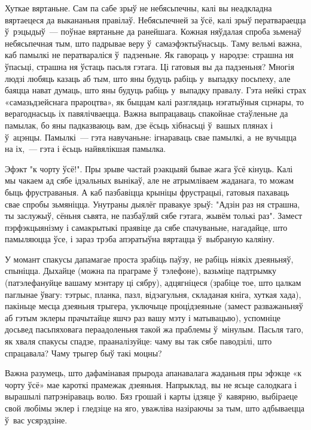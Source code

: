 Хуткае вяртаньне. Сам па сабе зрыў не небясьпечны, калі вы неадкладна вяртаецеся да выкананьня правілаў. Небясьпечней за ўсё, калі зрыў ператвараецца ў~рэцыдыў~--- поўнае вяртаньне да ранейшага. Кожная няўдалая спроба зьменаў небясьпечная тым, што падрывае веру ў~самаэфэктыўнасьць. Таму вельмі важна, каб памылкі не ператвараліся ў~падзеньне. Як гавораць у~народзе: страшна ня ўпасьці, страшна ня ўстаць пасьля гэтага. Ці гатовыя вы да падзеньня? Многія людзі любяць казаць аб тым, што яны будуць рабіць у~выпадку посьпеху, але баяцца нават думаць, што яны будуць рабіць у~выпадку правалу. Гэта нейкі страх «самазьдзейснага прароцтва», як быццам калі разглядаць нэгатыўныя сцэнары, то верагоднасьць іх павялічваецца. Важна выпрацаваць спакойнае стаўленьне да памылак, бо яны падказваюць вам, дзе ёсьць хібнасьці ў~вашых плянах і ў~ацэнцы. Памылкі~--- гэта навучаньне: ігнараваць свае памылкі, а~не вучыцца на іх,~--- гэта і ёсьць найвялікшая памылка.

Эфэкт "к чорту ўсё!". Пры зрыве частай рэакцыяй бывае жага ўсё кінуць. Калі мы чакаем ад сябе ідэальных вынікаў, але не атрымліваем жаданага, то можам быць фрустраваныя. А каб пазбавіцца крыніцы фрустрацыі, гатовыя пахаваць свае спробы зьмяніцца. Унутраны дыялёг правакуе зрыў: "Адзін раз ня страшна, ты заслужыў, сёньня сьвята, не пазбаўляй сябе гэтага, жывём толькі раз". Замест пэрфэкцыянізму і самакрытыкі праявіце да сябе спачуваньне, нагадайце, што памыляюцца ўсе, і зараз трэба апэратыўна вяртацца ў~выбраную каляіну.

У момант спакусы дапамагае проста зрабіць паўзу, не рабіць ніякіх дзеяньняў, спыніцца. Дыхайце (можна па праграме ў~тэлефоне), вазьміце падтрымку (патэлефануйце вашаму мэнтару ці сябру), адцягніцеся (зрабіце тое, што цалкам паглынае ўвагу: тэтрыс, планка, пазл, відэагульня, складаная кніга, хуткая хада), пакіньце месца дзеяньня трыгера, уключыце процідзеяньне (замест разважаньняў аб гэтым эклеры прачытайце яшчэ раз вашу мэту і матывацыю), успомніце досьвед пасьпяховага пераадоленьня такой жа праблемы ў~мінулым. Пасьля таго, як хваля спакусы спадзе, прааналізуйце: чаму вы так сябе паводзілі, што спрацавала? Чаму трыгер быў такі моцны?

Важна разумець, што дафамінавая прырода апанавалага жаданьня пры эфэкце «к чорту ўсё» мае кароткі прамежак дзеяньня. Напрыклад, вы не ясьце салодкага і вырашылі патрэніраваць волю. Бяз грошай і карты ідзяце ў~кавярню, выбіраеце свой любімы эклер і гледзіце на яго, уважліва назіраючы за тым, што адбываецца ў~вас усярэдзіне.

